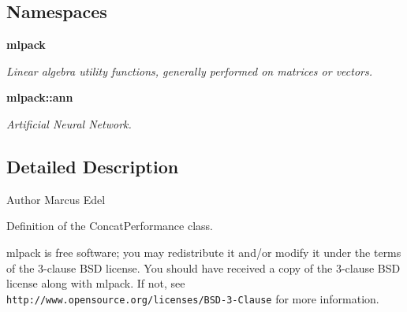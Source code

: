 \subsection*{Namespaces}
\begin{DoxyCompactItemize}
\item 
 \textbf{ mlpack}
\begin{DoxyCompactList}\small\item\em Linear algebra utility functions, generally performed on matrices or vectors. \end{DoxyCompactList}\item 
 \textbf{ mlpack\+::ann}
\begin{DoxyCompactList}\small\item\em Artificial Neural Network. \end{DoxyCompactList}\end{DoxyCompactItemize}


\subsection{Detailed Description}
\begin{DoxyAuthor}{Author}
Marcus Edel
\end{DoxyAuthor}
Definition of the Concat\+Performance class.

mlpack is free software; you may redistribute it and/or modify it under the terms of the 3-\/clause B\+SD license. You should have received a copy of the 3-\/clause B\+SD license along with mlpack. If not, see {\tt http\+://www.\+opensource.\+org/licenses/\+B\+S\+D-\/3-\/\+Clause} for more information. 